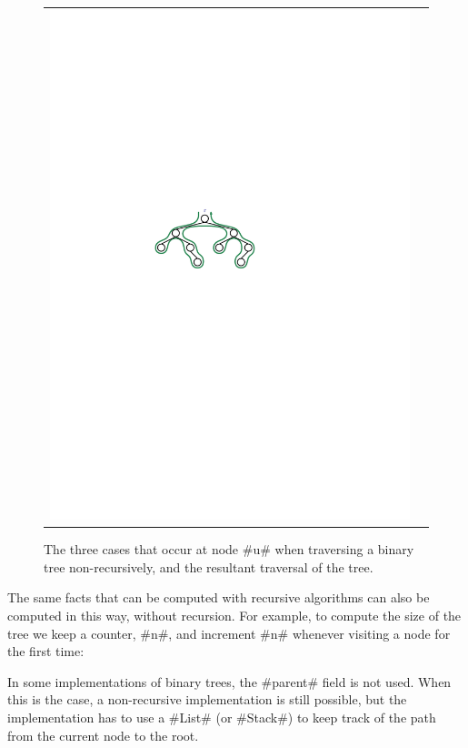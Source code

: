 \begin{figure}
\begin{center}
\begin{tabular}{cc}
      \includegraphics[scale=0.90909]{figs/bintree-3}
    \end{tabular}
  \end{center}
  \caption[Traversing a BinaryTree]{The three cases that occur at node
    #u# when traversing a binary tree non-recursively, and the resultant
    traversal of the tree.}
\end{figure}

The same facts that can be computed with recursive algorithms can also be
computed in this way, without recursion. For example, to compute the size
of the tree we keep a counter, #n#, and increment #n# whenever visiting
a node for the first time:

In some implementations of binary trees, the #parent# field is not used.
When this is the case, a non-recursive implementation is still possible,
but the implementation has to use a #List# (or #Stack#) to keep track
of the path from the current node to the root.

